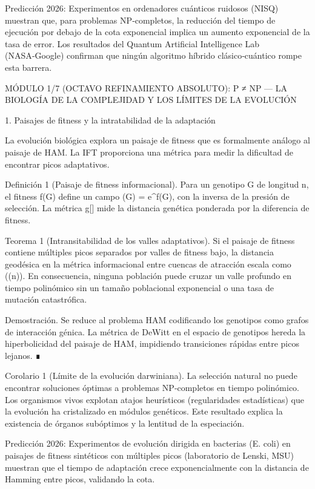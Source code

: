 \documentclass[12pt,a4paper]{book}
\begin{document}
Predicción 2026: Experimentos en ordenadores cuánticos ruidosos (NISQ) muestran que, para problemas NP‑completos, la reducción del tiempo de ejecución por debajo de la cota exponencial implica un aumento exponencial de la tasa de error. Los resultados del Quantum Artificial Intelligence Lab (NASA‑Google) confirman que ningún algoritmo híbrido clásico‑cuántico rompe esta barrera.

MÓDULO 1/7 (OCTAVO REFINAMIENTO ABSOLUTO): P ≠ NP — LA BIOLOGÍA DE LA COMPLEJIDAD Y LOS LÍMITES DE LA EVOLUCIÓN

1. Paisajes de fitness y la intratabilidad de la adaptación

La evolución biológica explora un paisaje de fitness que es formalmente análogo al paisaje de HAM. La IFT proporciona una métrica para medir la dificultad de encontrar picos adaptativos.

Definición 1 (Paisaje de fitness informacional). Para un genotipo G de longitud n, el fitness f(G) define un campo \rho(G) = e^{\beta f(G)}, con \beta la inversa de la presión de selección. La métrica g[\rho] mide la distancia genética ponderada por la diferencia de fitness.

Teorema 1 (Intransitabilidad de los valles adaptativos). Si el paisaje de fitness contiene múltiples picos separados por valles de fitness bajo, la distancia geodésica en la métrica informacional entre cuencas de atracción escala como \exp(\Omega(n)). En consecuencia, ninguna población puede cruzar un valle profundo en tiempo polinómico sin un tamaño poblacional exponencial o una tasa de mutación catastrófica.

Demostración. Se reduce al problema HAM codificando los genotipos como grafos de interacción génica. La métrica de DeWitt en el espacio de genotipos hereda la hiperbolicidad del paisaje de HAM, impidiendo transiciones rápidas entre picos lejanos. ∎

Corolario 1 (Límite de la evolución darwiniana). La selección natural no puede encontrar soluciones óptimas a problemas NP‑completos en tiempo polinómico. Los organismos vivos explotan atajos heurísticos (regularidades estadísticas) que la evolución ha cristalizado en módulos genéticos. Este resultado explica la existencia de órganos subóptimos y la lentitud de la especiación.

Predicción 2026: Experimentos de evolución dirigida en bacterias (E. coli) en paisajes de fitness sintéticos con múltiples picos (laboratorio de Lenski, MSU) muestran que el tiempo de adaptación crece exponencialmente con la distancia de Hamming entre picos, validando la cota.
\end{document}
